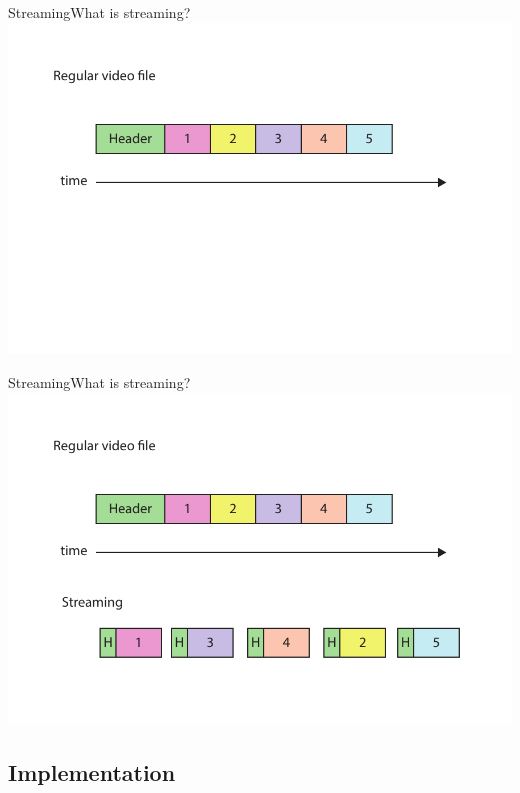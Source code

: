 \begin{frame}{Streaming}{What is streaming?}
  \includegraphics[width=1\textwidth]{images/file_vs_stream1.pdf}
\end{frame}

\begin{frame}{Streaming}{What is streaming?}
  \includegraphics[width=1\textwidth]{images/file_vs_stream2.pdf}
\end{frame}

\subsection{Implementation}

